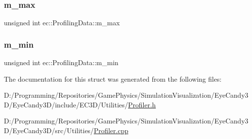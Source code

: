 \subsubsection{\texorpdfstring{m\+\_\+max}{m\_max}}
{\footnotesize\ttfamily unsigned int ec\+::\+Profiling\+Data\+::m\+\_\+max}

\mbox{\label{structec_1_1_profiling_data_a2dd2e0b50fb962c7b067906f60542dd5}} 
\subsubsection{\texorpdfstring{m\+\_\+min}{m\_min}}
{\footnotesize\ttfamily unsigned int ec\+::\+Profiling\+Data\+::m\+\_\+min}



The documentation for this struct was generated from the following files\+:\begin{DoxyCompactItemize}
\item 
D\+:/\+Programming/\+Repositories/\+Game\+Physics/\+Simulation\+Visualization/\+Eye\+Candy3\+D/\+Eye\+Candy3\+D/include/\+E\+C3\+D/\+Utilities/\mbox{\hyperlink{_profiler_8h}{Profiler.\+h}}\item 
D\+:/\+Programming/\+Repositories/\+Game\+Physics/\+Simulation\+Visualization/\+Eye\+Candy3\+D/\+Eye\+Candy3\+D/src/\+Utilities/\mbox{\hyperlink{_profiler_8cpp}{Profiler.\+cpp}}\end{DoxyCompactItemize}
